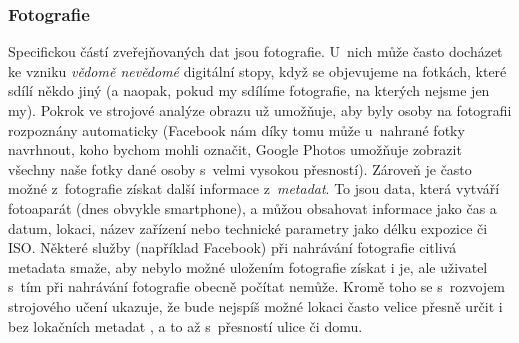 \subsubsection*{Fotografie}
Specifickou částí zveřejňovaných dat jsou fotografie. U~nich může často docházet ke vzniku \textit{vědomě nevědomé} digitální stopy, když se objevujeme na fotkách, které sdílí někdo jiný (a naopak, pokud my sdílíme fotografie, na kterých nejsme jen my).
Pokrok ve strojové analýze obrazu už umožňuje, aby byly osoby na fotografii rozpoznány automaticky (Facebook nám díky tomu může u~nahrané fotky navrhnout, koho bychom mohli označit, Google Photos umožňuje zobrazit všechny naše fotky dané osoby s~velmi vysokou přesností).
Zároveň je často možné z~fotografie získat další informace z~\textit{metadat}. To jsou data, která vytváří fotoaparát (dnes obvykle smartphone), a můžou obsahovat informace jako čas a datum, lokaci, název zařízení nebo technické parametry jako délku expozice či ISO. Některé služby (například Facebook) při nahrávání fotografie citlivá metadata smaže, aby nebylo možné uložením fotografie získat i je, ale uživatel s~tím při nahrávání fotografie obecně počítat nemůže.
Kromě toho se s~rozvojem strojového učení ukazuje, že bude nejspíš možné lokaci často velice přesně určit i bez lokačních metadat \citep{ai-photo-location}, a to až s~přesností ulice či domu. 


